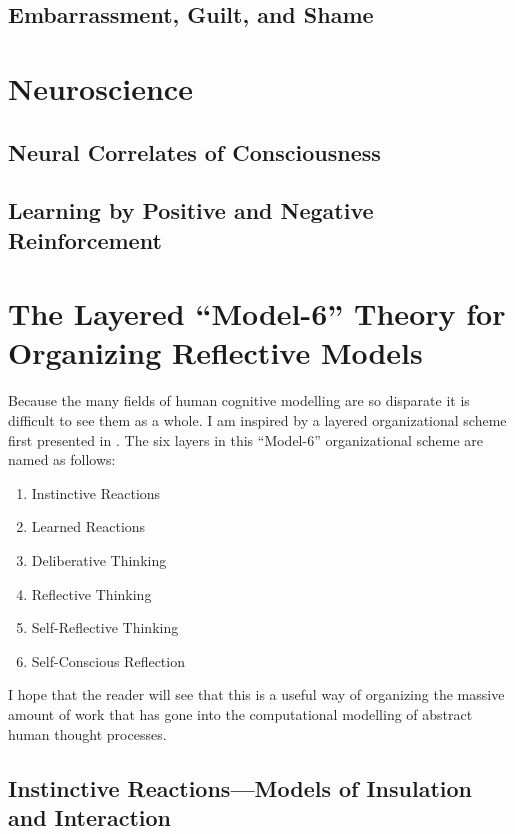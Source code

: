 \subsection{Embarrassment, Guilt, and Shame}



\section{Neuroscience}

\subsection{Neural Correlates of Consciousness}

\subsection{Learning by Positive and Negative Reinforcement}





\section{The Layered ``Model-6'' Theory for Organizing Reflective Models}

Because the many fields of human cognitive modelling are so disparate
it is difficult to see them as a whole.  I am inspired by a layered
organizational scheme first presented in \cite{minsky:2006}.  The
six layers in this ``Model-6'' organizational scheme are named as
follows:

\begin{enumerate}
\item{Instinctive Reactions}
\item{Learned Reactions}
\item{Deliberative Thinking}
\item{Reflective Thinking}
\item{Self-Reflective Thinking}
\item{Self-Conscious Reflection}
\end{enumerate}

I hope that the reader will see that this is a useful way of
organizing the massive amount of work that has gone into the
computational modelling of abstract human thought processes.

\subsection{Instinctive Reactions---Models of Insulation and Interaction}

